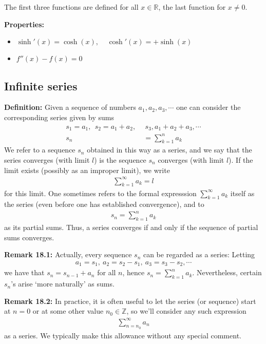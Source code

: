 \documentclass[11pt]{article}
\begin{document}
The first three functions are defined for all $x \in \mathbb{R}$, the last function for $x \neq 0$.

\textbf{Properties:}
\begin{itemize}
    \item $\sinh'(x) = \cosh(x), ~~~~~ \cosh'(x) = + \sinh(x)$
    
    \item $f''(x) - f(x) = 0$
\end{itemize} 

\newpage

\begin{center}
    \section*{Infinite series}
\end{center}


\textbf{Definition:} Given a sequence of numbers $a_1, a_2, a_3, \cdots$ one can consider the corresponding series given by sums
\begin{align*}
    s_1 = a_1, ~~ s_2 = a_1 + a_2,~&~ s_3, a_1+ a_2+a_3, \cdots \\
    s_n &= \sum_{k=1}^n a_k
\end{align*}
We refer to a sequence $s_n$ obtained in this way as a series, and we say that the series converges (with limit $l$) is the sequence $s_n$ converges (with limit $l$). If the limit exists (possibly as an improper limit), we write 
\begin{align*}
    \sum_{k=1}^\infty a_k = l
\end{align*}
for this limit. One sometimes refers to the formal expresssion $\sum_{k=1}^\infty a_k$ itself as the series (even before one has established convergence), and to 
\begin{align*}
    s_n = \sum_{k=1}^n a_k
\end{align*}
as its partial sums. Thus, a series converges if and only if the sequence of partial sums converges.


\textbf{Remark 18.1:} Actually, every sequence $s_n$ can be regarded as a series: Letting
\begin{align*}
    a_1 = s_1, ~ a_2 = s_2 - s_1, ~ a_3 = s_3 - s_2, \cdots
\end{align*}
we have that $s_n = s_{n-1} + a_n$ for all $n$, hence $s_n = \sum_{k=1}^n a_k$. Nevertheless, certain $s_n$'s arise `more naturally' as sums.

\textbf{Remark 18.2:} In practice, it is often useful to let the series (or sequence) start at $n = 0$ or at some other value $n_0 \in \mathbb{Z}$, so we'll consider any such expression 
\begin{align*}
    \sum_{n = n_0}^\infty a_n
\end{align*}
as a series. We typically make this allowance without any special comment.
\end{document}
